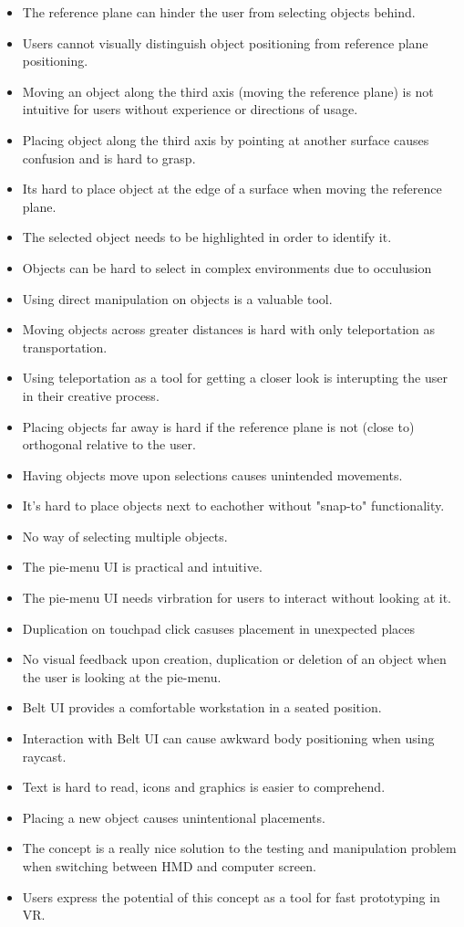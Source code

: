 \begin{itemize}

  \item The reference plane can hinder the user from selecting objects behind.
  \item Users cannot visually distinguish object positioning from reference plane positioning.
  \item Moving an object along the third axis (moving the reference plane) is not intuitive for users without experience or directions of usage.
  \item Placing object along the third axis by pointing at another surface causes confusion and is hard to grasp.
  \item Its hard to place object at the edge of a surface when moving the reference plane.

  \item The selected object needs to be highlighted in order to identify it.
  \item Objects can be hard to select in complex environments due to occulusion
  \item Using direct manipulation on objects is a valuable tool.
  \item Moving objects across greater distances is hard with only teleportation as transportation.
  \item Using teleportation as a tool for getting a closer look is interupting the user in their creative process.
  \item Placing objects far away is hard if the reference plane is not (close to) orthogonal relative to the user.
  \item Having objects move upon selections causes unintended movements.
  \item It's hard to place objects next to eachother without "snap-to" functionality.
  \item No way of selecting multiple objects.

  \item The pie-menu UI is practical and intuitive.
  \item The pie-menu UI needs virbration for users to interact without looking at it.
  \item Duplication on touchpad click casuses placement in unexpected places
  \item No visual feedback upon creation, duplication or deletion of an object when the user is looking at the pie-menu.

  \item Belt UI provides a comfortable workstation in a seated position.
  \item Interaction with Belt UI can cause awkward body positioning when using raycast.
  \item Text is hard to read, icons and graphics is easier to comprehend.
  \item Placing a new object causes unintentional placements.

  \item The concept is a really nice solution to the testing and manipulation problem when switching between HMD and computer screen.
  \item Users express the potential of this concept as a tool for fast prototyping in VR.

\end{itemize}
